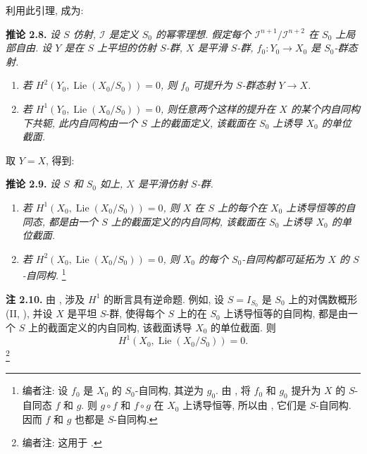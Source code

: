 利用此引理,  成为:

\medskip
\noindent{}\textbf{推论 2.8.}
\textit{设 \(S\) 仿射, \(\mathscr I\) 是定义 \(S_0\) 的幂零理想.
假定每个 \(\mathscr I^{n+1}/\mathscr I^{n+2}\) 在 \(S_0\) 上局部自由.
设 \(Y\) 是在 \(S\) 上平坦的仿射 \(S\)-群,
\(X\) 是平滑 \(S\)-群, \(f_0:Y_0\to X_0\) 是 \(S_0\)-群态射.}
\begin{enumerate}
\item[\(i\)]
\textit{若 \(H^2(Y_0,\operatorname{Lie}(X_0/S_0))=0\),
则 \(f_0\) 可提升为 \(S\)-群态射 \(Y\to X\).}
\item[\SGAInlineRefTarget{sga3:iii:corollary:2-8:item:ii}(ii)]
\textit{若 \(H^1(Y_0,\operatorname{Lie}(X_0/S_0))=0\),
则任意两个这样的提升在 \(X\) 的某个内自同构下共轭,
此内自同构由一个 \(S\) 上的截面定义,
该截面在 \(S_0\) 上诱导 \(X_0\) 的单位截面.}
\end{enumerate}

取 \(Y=X\), 得到:

\medskip
\noindent{}\textbf{推论 2.9.}
\textit{设 \(S\) 和 \(S_0\) 如上, \(X\) 是平滑仿射 \(S\)-群.}
\begin{enumerate}
\item[\(i\)] \textit{若
\(H^1(X_0,\operatorname{Lie}(X_0/S_0))=0\),
则 \(X\) 在 \(S\) 上的每个在 \(X_0\) 上诱导恒等的自同态,
都是由一个 \(S\) 上的截面定义的内自同构,
该截面在 \(S_0\) 上诱导 \(X_0\) 的单位截面.}
\item[(ii)] \textit{若
\(H^2(X_0,\operatorname{Lie}(X_0/S_0))=0\),
则 \(X_0\) 的每个 \(S_0\)-自同构都可延拓为
\(X\) 的 \(S\)-自同构.}
\footnote{编者注: 设 \(f_0\) 是 \(X_0\) 的
\(S_0\)-自同构, 其逆为 \(g_0\). 由
, 将
\(f_0\) 和 \(g_0\) 提升为 \(X\) 的 \(S\)-自同态 \(f\) 和 \(g\).
则 \(g\circ f\) 和 \(f\circ g\) 在 \(X_0\) 上诱导恒等,
所以由 , 它们是 \(S\)-自同构.
因而 \(f\) 和 \(g\) 也都是 \(S\)-自同构.}
\end{enumerate}

\medskip
\noindent{}\textbf{注 2.10.}
由 ,
涉及 \(H^1\) 的断言具有逆命题.
例如, 设 \(S=I_{S_0}\) 是 \(S_0\) 上的对偶数概形
(II, ),
并设 \(X\) 是平坦 \(S\)-群, 使得每个 \(S\) 上的在
\(S_0\) 上诱导恒等的自同构, 都是由一个 \(S\) 上的截面定义的内自同构,
该截面诱导 \(X_0\) 的单位截面. 则
\[
 H^1(X_0,\operatorname{Lie}(X_0/S_0))=0.
\]
\footnote{编者注: 这用于 .}

